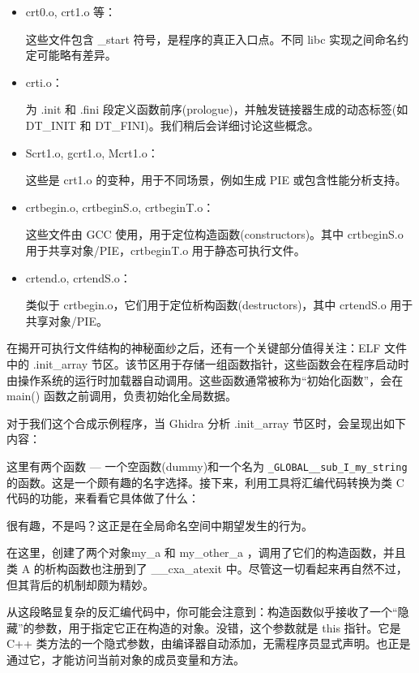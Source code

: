 \begin{itemize}
\item 
crt0.o, crt1.o 等：

这些文件包含 \_start 符号，是程序的真正入口点。不同 libc 实现之间命名约定可能略有差异。

\item 
crti.o：

为 .init 和 .fini 段定义函数前序(prologue)，并触发链接器生成的动态标签(如 DT\_INIT 和 DT\_FINI)。我们稍后会详细讨论这些概念。

\item 
Scrt1.o, gcrt1.o, Mcrt1.o：

这些是 crt1.o 的变种，用于不同场景，例如生成 PIE 或包含性能分析支持。

\item 
crtbegin.o, crtbeginS.o, crtbeginT.o：

这些文件由 GCC 使用，用于定位构造函数(constructors)。其中 crtbeginS.o 用于共享对象/PIE，crtbeginT.o 用于静态可执行文件。

\item 
crtend.o, crtendS.o：

类似于 crtbegin.o，它们用于定位析构函数(destructors)，其中 crtendS.o 用于共享对象/PIE。
\end{itemize}

在揭开可执行文件结构的神秘面纱之后，还有一个关键部分值得关注：ELF 文件中的 .init\_array 节区。该节区用于存储一组函数指针，这些函数会在程序启动时由操作系统的运行时加载器自动调用。这些函数通常被称为“初始化函数”，会在 main() 函数之前调用，负责初始化全局数据。

对于我们这个合成示例程序，当 Ghidra 分析 .init\_array 节区时，会呈现出如下内容：


这里有两个函数 --- 一个空函数(dummy)和一个名为 \verb|_GLOBAL__sub_I_my_string| 的函数。这是一个颇有趣的名字选择。接下来，利用工具将汇编代码转换为类 C 代码的功能，来看看它具体做了什么：


很有趣，不是吗？这正是在全局命名空间中期望发生的行为。

在这里，创建了两个对象my\_a 和 my\_other\_a ，调用了它们的构造函数，并且类 A 的析构函数也注册到了 \_\_cxa\_atexit 中。尽管这一切看起来再自然不过，但其背后的机制却颇为精妙。

从这段略显复杂的反汇编代码中，你可能会注意到：构造函数似乎接收了一个“隐藏”的参数，用于指定它正在构造的对象。没错，这个参数就是 this 指针。它是 C++ 类方法的一个隐式参数，由编译器自动添加，无需程序员显式声明。也正是通过它，才能访问当前对象的成员变量和方法。

